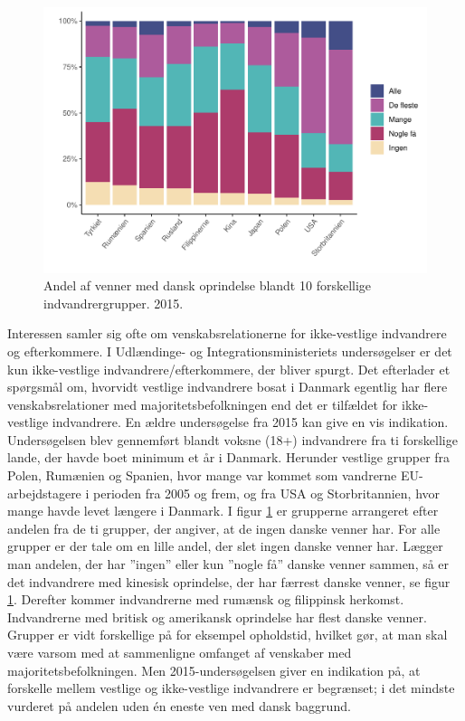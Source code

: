 \documentclass[
]{book}
\begin{document}
\begin{figure}
\includegraphics[width=1\linewidth]{en-befolkning-blander-sig_files/figure-latex/fig-6-3-1} \caption{Andel af venner med dansk oprindelse blandt 10 forskellige indvandrergrupper. 2015.}\label{fig:fig-6-3}
\end{figure}

Interessen samler sig ofte om venskabsrelationerne for ikke-vestlige indvandrere og efterkommere. I Udlændinge- og Integrationsministeriets undersøgelser er det kun ikke-vestlige indvandrere/efterkommere, der bliver spurgt. Det efterlader et spørgsmål om, hvorvidt vestlige indvandrere bosat i Danmark egentlig har flere venskabsrelationer med majoritetsbefolkningen end det er tilfældet for ikke-vestlige indvandrere. En ældre undersøgelse fra 2015 kan give en vis indikation. Undersøgelsen blev gennemført blandt voksne (18+) indvandrere fra ti forskellige lande, der havde boet minimum et år i Danmark. Herunder vestlige grupper fra Polen, Rumænien og Spanien, hvor mange var kommet som vandrerne EU-arbejdstagere i perioden fra 2005 og frem, og fra USA og Storbritannien, hvor mange havde levet længere i Danmark. I figur \ref{fig:fig-6-3} er grupperne arrangeret efter andelen fra de ti grupper, der angiver, at de ingen danske venner har. For alle grupper er der tale om en lille andel, der slet ingen danske venner har. Lægger man andelen, der har ''ingen'' eller kun ''nogle få'' danske venner sammen, så er det indvandrere med kinesisk oprindelse, der har færrest danske venner, se figur \ref{fig:fig-6-3}. Derefter kommer indvandrerne med rumænsk og filippinsk herkomst. Indvandrerne med britisk og amerikansk oprindelse har flest danske venner. Grupper er vidt forskellige på for eksempel opholdstid, hvilket gør, at man skal være varsom med at sammenligne omfanget af venskaber med majoritetsbefolkningen. Men 2015-undersøgelsen giver en indikation på, at forskelle mellem vestlige og ikke-vestlige indvandrere er begrænset; i det mindste vurderet på andelen uden én eneste ven med dansk baggrund.
\end{document}
